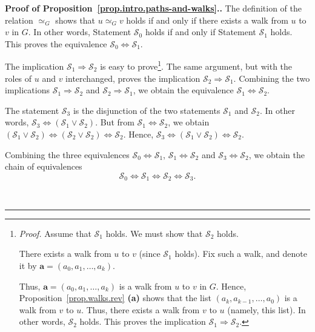 \documentclass[numbers=enddot,12pt,final,onecolumn,notitlepage]{scrartcl}%
\theoremstyle{definition}
\newenvironment{proof}[1][Proof]{\noindent\textbf{#1.} }{\ \rule{0.5em}{0.5em}}
\newcommand{\tup}[1]{\left( #1 \right)}
\begin{document}
\begin{proof}[Proof of Proposition~\ref{prop.intro.paths-and-walks}.]
The definition of the relation $\simeq_G$ shows that $u \simeq_G v$
holds if and only if there exists a walk from $u$ to $v$ in $G$. In
other words, Statement $\mathcal{S}_0$ holds if and only if
Statement $\mathcal{S}_1$ holds. This proves the equivalence
$\mathcal{S}_0 \Longleftrightarrow \mathcal{S}_1$.

The implication $\mathcal{S}_1 \Longrightarrow \mathcal{S}_2$ is
easy to prove\footnote{\textit{Proof.} Assume that $\mathcal{S}_1$
holds. We must show that $\mathcal{S}_2$ holds.

There exists a walk from $u$ to $v$ (since $\mathcal{S}_1$ holds).
Fix such a walk, and denote it by
$\mathbf{a} = \tup{a_0, a_1, \ldots, a_k}$.

Thus, $\mathbf{a} = \tup{a_0, a_1, \ldots, a_k}$ is a walk from $u$
to $v$ in $G$.
Hence, Proposition~\ref{prop.walks.rev} \textbf{(a)} shows that the
list $\tup{a_k, a_{k-1}, \ldots, a_0}$ is a walk from $v$ to $u$.
Thus, there exists a walk from $v$ to $u$ (namely, this list). In
other words, $\mathcal{S}_2$ holds. This proves the implication
$\mathcal{S}_1 \Longrightarrow \mathcal{S}_2$.}. The same argument,
but with the roles of $u$ and $v$ interchanged, proves the implication
$\mathcal{S}_2 \Longrightarrow \mathcal{S}_1$. Combining the two
implications $\mathcal{S}_1 \Longrightarrow \mathcal{S}_2$ and
$\mathcal{S}_2 \Longrightarrow \mathcal{S}_1$, we obtain the
equivalence
$\mathcal{S}_1 \Longleftrightarrow \mathcal{S}_2$.

The statement $\mathcal{S}_3$ is the disjunction of the two statements
$\mathcal{S}_1$ and $\mathcal{S}_2$. In other words,
$\mathcal{S}_3 \Longleftrightarrow
\tup{\mathcal{S}_1 \vee \mathcal{S}_2}$. But from
$\mathcal{S}_1 \Longleftrightarrow \mathcal{S}_2$, we obtain
$\tup{\mathcal{S}_1 \vee \mathcal{S}_2}
\Longleftrightarrow \tup{\mathcal{S}_2 \vee \mathcal{S}_2}
\Longleftrightarrow \mathcal{S}_2$. Hence,
$\mathcal{S}_3 \Longleftrightarrow
\tup{\mathcal{S}_1 \vee \mathcal{S}_2}
\Longleftrightarrow \mathcal{S}_2$.

Combining the three equivalences
$\mathcal{S}_0 \Longleftrightarrow \mathcal{S}_1$,
$\mathcal{S}_1 \Longleftrightarrow \mathcal{S}_2$ and
$\mathcal{S}_3 \Longleftrightarrow \mathcal{S}_2$, we obtain the
chain of equivalences
\begin{equation}
\mathcal{S}_0 \Longleftrightarrow \mathcal{S}_1 \Longleftrightarrow
\mathcal{S}_2 \Longleftrightarrow \mathcal{S}_3 .
\label{pf.prop.intro.paths-and-walks.chain1}
\end{equation}


\end{proof}
\end{document}
